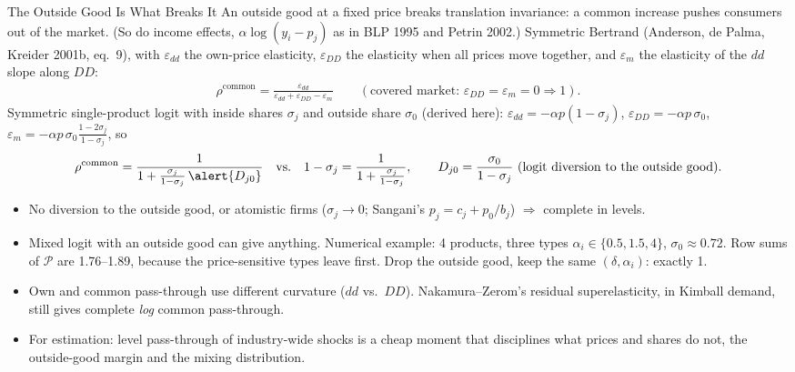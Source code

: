 \documentclass[aspectratio=169,10pt]{beamer}
\begin{document}
\begin{frame}{The Outside Good Is What Breaks It}
\footnotesize
An outside good at a fixed price breaks translation invariance: a common increase pushes consumers out of the market. (So do income effects, $\alpha \log(y_i - p_j)$ as in BLP 1995 and Petrin 2002.) Symmetric Bertrand (Anderson, de Palma, Kreider 2001b, eq.\ 9), with $\varepsilon_{dd}$ the own-price elasticity, $\varepsilon_{DD}$ the elasticity when all prices move together, and $\varepsilon_m$ the elasticity of the $dd$ slope along $DD$:
\begin{align*}
\rho^{\text{common}} = \frac{\varepsilon_{dd}}{\varepsilon_{dd} + \varepsilon_{DD} - \varepsilon_m}
\qquad (\text{covered market: } \varepsilon_{DD} = \varepsilon_m = 0 \Rightarrow 1).
\end{align*}
Symmetric single-product logit with inside shares $\sigma_j$ and outside share $\sigma_0$ (derived here): $\varepsilon_{dd} = -\alpha p(1-\sigma_j)$, $\varepsilon_{DD} = -\alpha p\, \sigma_0$, $\varepsilon_m = -\alpha p\, \sigma_0 \frac{1-2\sigma_j}{1-\sigma_j}$, so
\begin{align*}
\rho^{\text{common}} = \frac{1}{1 + \frac{\sigma_j}{1-\sigma_j}\, \alert{D_{j0}}} \quad\text{vs.}\quad 1-\sigma_j = \frac{1}{1 + \frac{\sigma_j}{1-\sigma_j}},
\qquad D_{j0} = \frac{\sigma_0}{1-\sigma_j} \text{ (logit diversion to the outside good)}.
\end{align*}
\begin{itemize}
\item No diversion to the outside good, or atomistic firms ($\sigma_j \to 0$; Sangani's $p_j = c_j + p_0/b_j$) $\Rightarrow$ complete in levels.
\item Mixed logit with an outside good can give anything. Numerical example: 4 products, three types $\alpha_i \in \{0.5, 1.5, 4\}$, $\sigma_0 \approx 0.72$. Row sums of $\mathcal{P}$ are \alert{1.76--1.89}, because the price-sensitive types leave first. Drop the outside good, keep the same $(\delta, \alpha_i)$: exactly 1.
\item Own and common pass-through use different curvature ($dd$ vs.\ $DD$). Nakamura--Zerom's residual superelasticity, in Kimball demand, still gives complete \emph{log} common pass-through.
\item For estimation: level pass-through of industry-wide shocks is a cheap moment that disciplines what prices and shares do not, \alert{the outside-good margin and the mixing distribution}.
\end{itemize}
\end{frame}
\end{document}
